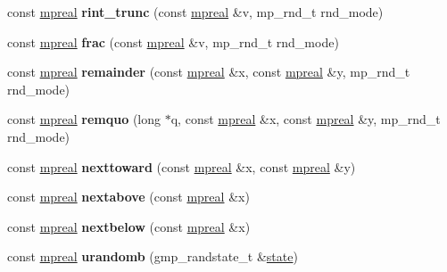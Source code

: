 \begin{DoxyCompactItemize}
\mbox{\label{classmpfr_1_1mpreal_a0eff17a5c603b822fdb63e59ebb730c7}} 
const \hyperlink{classmpfr_1_1mpreal}{mpreal} {\bfseries rint\+\_\+trunc} (const \hyperlink{classmpfr_1_1mpreal}{mpreal} \&v, mp\+\_\+rnd\+\_\+t rnd\+\_\+mode)
\item 
\mbox{\label{classmpfr_1_1mpreal_a7fe97c8636a036f36cb1e98f782bf287}} 
const \hyperlink{classmpfr_1_1mpreal}{mpreal} {\bfseries frac} (const \hyperlink{classmpfr_1_1mpreal}{mpreal} \&v, mp\+\_\+rnd\+\_\+t rnd\+\_\+mode)
\item 
\mbox{\label{classmpfr_1_1mpreal_aca7d313d777a289692f4d0f73ae09018}} 
const \hyperlink{classmpfr_1_1mpreal}{mpreal} {\bfseries remainder} (const \hyperlink{classmpfr_1_1mpreal}{mpreal} \&x, const \hyperlink{classmpfr_1_1mpreal}{mpreal} \&y, mp\+\_\+rnd\+\_\+t rnd\+\_\+mode)
\item 
\mbox{\label{classmpfr_1_1mpreal_a8a3fcae18c5f636c8a4c6341100ef8b3}} 
const \hyperlink{classmpfr_1_1mpreal}{mpreal} {\bfseries remquo} (long $\ast$q, const \hyperlink{classmpfr_1_1mpreal}{mpreal} \&x, const \hyperlink{classmpfr_1_1mpreal}{mpreal} \&y, mp\+\_\+rnd\+\_\+t rnd\+\_\+mode)
\item 
\mbox{\label{classmpfr_1_1mpreal_af8811247fd961a5944f02d33dd349953}} 
const \hyperlink{classmpfr_1_1mpreal}{mpreal} {\bfseries nexttoward} (const \hyperlink{classmpfr_1_1mpreal}{mpreal} \&x, const \hyperlink{classmpfr_1_1mpreal}{mpreal} \&y)
\item 
\mbox{\label{classmpfr_1_1mpreal_a72974801eb3bba855566a29af1934206}} 
const \hyperlink{classmpfr_1_1mpreal}{mpreal} {\bfseries nextabove} (const \hyperlink{classmpfr_1_1mpreal}{mpreal} \&x)
\item 
\mbox{\label{classmpfr_1_1mpreal_a1202bca3385ba82b0dde615a544c08c9}} 
const \hyperlink{classmpfr_1_1mpreal}{mpreal} {\bfseries nextbelow} (const \hyperlink{classmpfr_1_1mpreal}{mpreal} \&x)
\item 
\mbox{\label{classmpfr_1_1mpreal_a5e5b1ebdd384d6d4e8804daca7c64cb5}} 
const \hyperlink{classmpfr_1_1mpreal}{mpreal} {\bfseries urandomb} (gmp\+\_\+randstate\+\_\+t \&\hyperlink{structstate}{state})

\end{DoxyCompactItemize}
